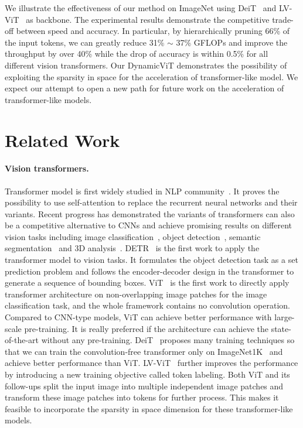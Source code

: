 \documentclass{article}
\begin{document}
We illustrate the effectiveness of our method on ImageNet using DeiT~\cite{touvron2020deit} and LV-ViT~\cite{jiang2021token} as backbone. The experimental results demonstrate the competitive trade-off between speed and accuracy. In particular, by hierarchically pruning 66\% of the input tokens, we can greatly reduce 31\% $\sim$ 37\% GFLOPs and improve the throughput by over 40\% while the drop of accuracy is within 0.5\% for all different vision transformers. Our DynamicViT demonstrates the possibility of exploiting the sparsity in space for the acceleration of transformer-like model. We expect our attempt to open a new path for future work on the acceleration of transformer-like models.


\section{Related Work}
\paragraph{Vision transformers. } Transformer model is first widely studied in NLP community~\cite{vaswani2017attention}. It proves the possibility to use self-attention to replace the recurrent neural networks and their variants. Recent progress has demonstrated the variants of transformers can also be a competitive alternative to CNNs and achieve promising results on different vision tasks including image classification~\cite{dosovitskiy2020vit,touvron2020deit,liu2021swin,zhou2021deepvit,rao2021global}, object detection~\cite{carion2020end}, semantic segmentation~\cite{SETR,cheng2021maskformer} and 3D analysis~\cite{yu2021pointr,zhao2020point}. DETR~\cite{carion2020end} is the first work to apply the transformer model to vision tasks. It formulates the object detection task as a set prediction problem and follows the encoder-decoder design in the transformer to generate a sequence of bounding boxes. ViT~\cite{dosovitskiy2020vit} is the first work to directly apply transformer architecture on non-overlapping image patches for the image classification task, and the whole framework contains no convolution operation. Compared to CNN-type models, ViT can achieve better performance with large-scale pre-training. It is really preferred if the architecture can achieve the state-of-the-art without any pre-training. DeiT~\cite{touvron2020deit} proposes many training techniques so that we can train the convolution-free transformer only on ImageNet1K~\cite{deng2009imagenet} and achieve better performance than ViT. LV-ViT~\cite{jiang2021token} further improves the performance by introducing a new training objective called token labeling.  Both ViT and its follow-ups split the input image into multiple independent image patches and transform these image patches into tokens for further process. This makes it feasible to incorporate the sparsity in space dimension for these transformer-like models. 
\end{document}
